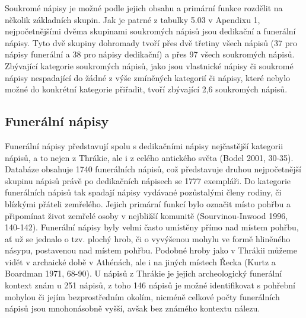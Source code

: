 Soukromé nápisy je možné podle jejich obsahu a primární funkce rozdělit na několik základních skupin. Jak je patrné z tabulky 5.03 v Apendixu 1, nejpočetnějšími dvěma skupinami soukromých nápisů jsou dedikační a funerální nápisy. Tyto dvě skupiny dohromady tvoří přes dvě třetiny všech nápisů (37  pro nápisy funerální a 38  pro nápisy dedikační) a přes 97  všech soukromých nápisů. Zbývající kategorie soukromých nápisů, jako jsou vlastnické nápisy či soukromé nápisy nespadající do žádné z výše zmíněných kategorií či nápisy, které nebylo možné do konkrétní kategorie přiřadit, tvoří zbývající 2,6  soukromých nápisů.

\subsection[funerální-nápisy]{Funerální nápisy}

Funerální nápisy představují spolu s dedikačními nápisy nejčastější kategorii nápisů, a to nejen z Thrákie, ale i z celého antického světa (Bodel 2001, 30-35). Databáze obsahuje 1740 funerálních nápisů, což představuje druhou nejpočetnější skupinu nápisů právě po dedikačních nápisech se 1777 exempláři. Do kategorie funerálních nápisů tak spadají nápisy vydávané pozůstalými členy rodiny, či blízkými přáteli zemřelého. Jejich primární funkcí bylo označit místo pohřbu a připomínat život zemřelé osoby v nejbližší komunitě (Sourvinou-Inwood 1996, 140-142). Funerální nápisy byly velmi často umístěny přímo nad místem pohřbu, ať už se jednalo o tzv. plochý hrob, či o vyvýšenou mohylu ve formě hliněného násypu, postavenou nad místem pohřbu. Podobné hroby jako v Thrákii můžeme vidět v archaické době v Athénách, ale i na jiných místech Řecka (Kurtz a Boardman 1971, 68-90). U nápisů z Thrákie je jejich archeologický funerální kontext znám u 251 nápisů, z toho 146 nápisů je možné identifikovat s pohřební mohylou či jejím bezprostředním okolím, nicméně celkové počty funerálních nápisů jsou mnohonásobně vyšší, avšak bez známého kontextu nálezu.

